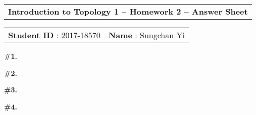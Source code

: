 \documentclass[a4paper,11pt]{article}
\begin{document}
\begin{tabular}{l}
    {\bfseries \Large  Introduction to Topology 1 -- Homework 2 -- Answer Sheet} \\
\end{tabular}

\vspace{3mm}

\begin{tabular}{c c}
    {\bfseries \large Student ID} : 2017-18570 \hspace{40mm} & {\bfseries \large Name} : Sungchan Yi  \hspace{30mm} \\
\end{tabular}

\vspace{7mm}

\begin{minipage}[t][260mm]{90mm}
    {\bfseries \large \#1.}
\end{minipage}
{\color{gray}\vline}
\begin{minipage}[t][260mm]{90mm}
    \phantom{?}
\end{minipage}

\newpage

\phantom{?}
\vspace{5mm}

\begin{minipage}[t][270mm]{90mm}
    {\bfseries \large \#2.}
\end{minipage}
{\color{gray}\vline}
\begin{minipage}[t][270mm]{90mm}
    \phantom{?}
\end{minipage}

\newpage

\phantom{?}
\vspace{5mm}

\begin{minipage}[t][270mm]{90mm}
    {\bfseries \large \#3.}
\end{minipage}
{\color{gray}\vline}
\begin{minipage}[t][270mm]{90mm}
    \phantom{?}
\end{minipage}

\newpage

\phantom{?}
\vspace{5mm}

\begin{minipage}[t][270mm]{90mm}
    {\bfseries \large \#4.}
\end{minipage}
{\color{gray}\vline}
\begin{minipage}[t][270mm]{90mm}
    \phantom{?}
\end{minipage}
\end{document}

